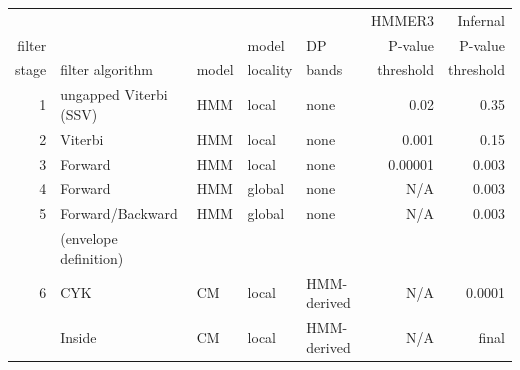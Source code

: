 \documentclass[custom,landscape,final,30pt,plainboxedsections]{sciposter-titleskipsmall}
\begin{document}
\begin{multicols}{3}
\begin{center}
\begin{small}
\begin{tabular}{rllllrr}
       &                             &          &          &       & HMMER3       & Infernal \\
filter &                             &          & model    & DP    & P-value      & P-value        \\
stage  & filter algorithm            & model    & locality & bands & threshold    & threshold      \\ \hline
1      & ungapped Viterbi (SSV)      & HMM      & local    & none  & 0.02         & 0.35           \\
2      & Viterbi                     & HMM      & local    & none  & 0.001        & 0.15           \\
3      & Forward                     & HMM      & local    & none  & 0.00001      & 0.003          \\
4      & Forward                     & HMM      & global   & none  & N/A          & 0.003          \\
5      & Forward/Backward            & HMM      & global   & none  & N/A          & 0.003          \\
       & (envelope definition)       &          &          &       &              &                \\
6      & CYK                         & CM       & local    & HMM-derived\cite{Brown00,Nawrocki09b} &  N/A   & 0.0001 \\
       & Inside                      & CM       & local    & HMM-derived\cite{Brown00,Nawrocki09b} &  N/A   & final  \\
\end{tabular}
\end{small}
\end{center}


\end{multicols}
\end{document}
